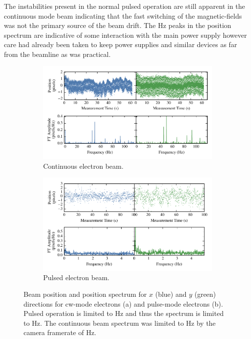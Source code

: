 The instabilities present in the normal pulsed operation are still apparent in the continuous mode beam indicating that the fast switching of the magnetic-fields was not the primary source of the beam drift.
The \unit[50]{Hz} peaks in the position spectrum are indicative of some interaction with the main power supply however care had already been taken to keep power supplies and similar devices as far from the beamline as was practical.

\begin{figure}
    \begin{subfigure}{\linewidth}
    \centering
    \includegraphics{part2/Figs/cw_beam_stability.pdf}
    \caption{Continuous electron beam.}
    \label{figure:cw_stability}
    \end{subfigure}

    \begin{subfigure}{\linewidth}
    \centering
    \includegraphics{part2/Figs/pulse_beam_stability.pdf}
    \caption{Pulsed electron beam.}
    \label{figure:pulse_stability}
    \end{subfigure}
    \caption[Beam stability for continuous and pulsed operation.]{Beam position and position spectrum for $x$ (blue) and $y$ (green) directions for \gls{cw}-mode electrons (a) and pulse-mode electrons (b).
    Pulsed operation is limited to \unit[10]{Hz} and thus the spectrum is limited to \unit[5]{Hz}. The continuous beam spectrum was limited to \unit[120]{Hz} by the camera framerate of \unit[240]{Hz}.}
    \label{figure:stability}
\end{figure}

